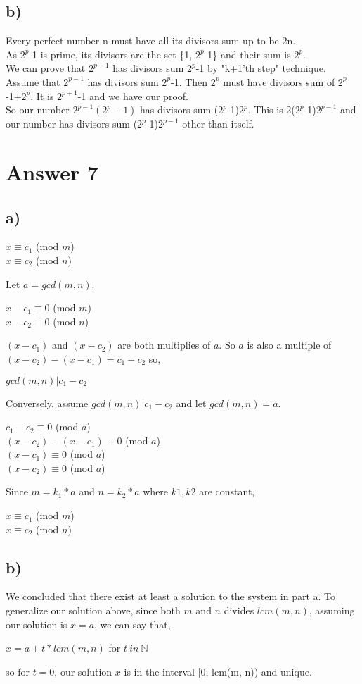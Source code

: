 \documentclass[12pt]{article}
\begin{document}
\subsection*{b)}
Every perfect number n must have all its divisors sum up to be 2n.\\
As $2^p$-1 is prime, its divisors are the set \{1, $2^p$-1\} and their sum is $2^p$.\\
We can prove that $2^{p-1}$ has divisors sum $2^p$-1 by "k+1'th step" technique. Assume that $2^{p-1}$ has divisors sum $2^p$-1. Then $2^p$ must have divisors sum of $2^p$-1+$2^p$. It is $2^{p+1}$-1 and we have our proof.\\
So our number $2^{p-1}(2^p-1)$ has divisors sum ($2^p$-1)$2^p$. This is 2($2^p$-1)$2^{p-1}$ and our number has divisors sum ($2^p$-1)$2^{p-1}$ other than itself.
\newpage
\section*{Answer 7}
\subsection*{a)}
\begin{center}
$x \equiv c_1$   (mod $m$) \\
$x \equiv c_2$   (mod $n$) \\
\end{center}
Let $a = gcd(m, n)$.
\begin{center}
$x-c_1 \equiv 0$   (mod $m$) \\
$x-c_2 \equiv 0$   (mod $n$) \\
\end{center}
$(x-c_1)$ and $(x-c_2)$ are both multiplies of $a$. So $a$ is also a multiple of $(x-c_2) - (x-c_1) = c_1 - c_2$ so,
\begin{center}
$gcd(m, n) | c_1 - c_2$
\end{center}
Conversely, assume $gcd(m, n) | c_1 - c_2$ and let $gcd(m, n) = a$.
\begin{center}
$c_1-c_2 \equiv 0$   (mod $a$)\\
$(x-c_2) - (x-c_1) \equiv 0$   (mod $a$)\\
$(x-c_1) \equiv 0$ (mod $a$)\\
$(x-c_2) \equiv 0$ (mod $a$)\\
\end{center}
Since $m = k_1*a$ and $n = k_2*a$ where $k1, k2$ are constant,
\begin{center}
$x \equiv c_1$ (mod $m$)\\
$x \equiv c_2$ (mod $n$)
\end{center}

\subsection*{b)}
We concluded that there exist at least a solution to the system in part a. To generalize our solution above, since both $m$ and $n$ divides $lcm(m, n)$, assuming our solution is $x = a$, we can say that,
\begin{center}
$x = a + t * lcm(m, n)$ for $t \ in\ \mathbb{N}$
\end{center}
so for $t = 0$, our solution $x$ is in the interval [0, lcm(m, n)) and unique.
\end{document}
